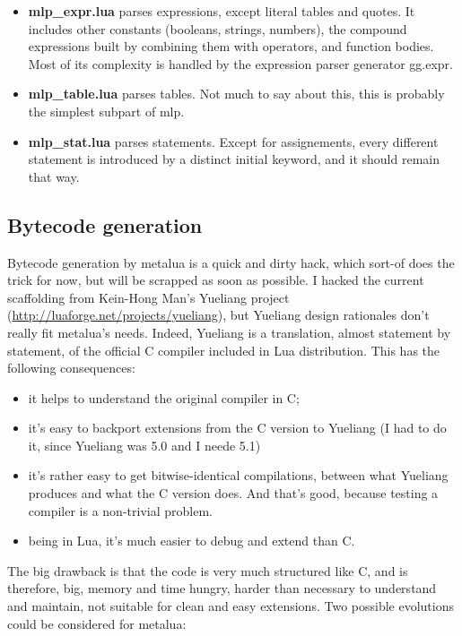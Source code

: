 \begin{itemize}
\item {\bf mlp\_expr.lua} parses expressions, except literal tables
  and quotes. It includes other constants (booleans, strings,
  numbers), the compound expressions built by combining them with
  operators, and function bodies. Most of its complexity is handled by
  the expression parser generator gg.expr.
\item {\bf mlp\_table.lua} parses tables. Not much to say about this,
  this is probably the simplest subpart of mlp.
\item {\bf mlp\_stat.lua} parses statements. Except for assignements,
  every different statement is introduced by a distinct initial
  keyword, and it should remain that way.
\end{itemize}

\subsection{Bytecode generation}
Bytecode generation by metalua is a quick and dirty hack, which
sort-of does the trick for now, but will be scrapped as soon as
possible. I hacked the current scaffolding from Kein-Hong Man's
Yueliang project (\url{http://luaforge.net/projects/yueliang}), but
Yueliang design rationales don't really fit metalua's needs. Indeed,
Yueliang is a translation, almost statement by statement, of the
official C compiler included in Lua distribution. This has the
following consequences:

\begin{itemize}
\item it helps to understand the original compiler in C;
\item it's easy to backport extensions from the C version to Yueliang
  (I had to do it, since Yueliang was 5.0 and I neede 5.1)
\item it's rather easy to get bitwise-identical compilations, between
  what Yueliang produces and what the C version does. And that's good,
  because testing a compiler is a non-trivial problem.
\item being in Lua, it's much easier to debug and extend than C.
\end{itemize}

The big drawback is that the code is very much structured like C, and
is therefore, big, memory and time hungry, harder than necessary to
understand and maintain, not suitable for clean and easy
extensions. Two possible evolutions could be considered for metalua:

